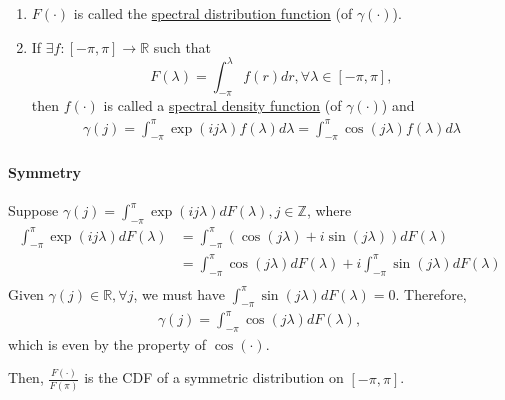 \documentclass[11pt]{elegantbook}
\begin{document}
\begin{remark}
    \begin{enumerate}
        \item $F(\cdot)$ is called the \underline{spectral distribution function} (of $\gamma(\cdot)$).
        \item If $\exists f:[-\pi, \pi] \rightarrow \mathbb{R}$ such that $$F(\lambda)=\int_{-\pi}^\lambda f(r)d r, \forall \lambda\in[-\pi, \pi],$$
        then $f(\cdot)$ is called a \underline{spectral density function} (of $\gamma(\cdot)$) and
        \begin{equation}
            \begin{aligned}
                \gamma(j)=\int_{-\pi}^\pi \exp\left(ij\lambda\right)f(\lambda)d \lambda = \int_{-\pi}^\pi \cos(j\lambda) f(\lambda) d \lambda
            \end{aligned}
            \nonumber
        \end{equation}
    \end{enumerate}
\end{remark}


\paragraph*{Symmetry} Suppose $\gamma(j)=\int_{-\pi}^\pi \exp\left(ij\lambda\right)d F(\lambda),j\in \mathbb{Z}$, where
\begin{equation}
    \begin{aligned}
        \int_{-\pi}^\pi \exp\left(ij\lambda\right)d F(\lambda)&=\int_{-\pi}^\pi \left(\cos(j\lambda)+i\sin(j\lambda)\right)d F(\lambda)\\
        &=\int_{-\pi}^\pi \cos(j\lambda)d F(\lambda) + i\int_{-\pi}^\pi\sin(j\lambda)d F(\lambda)\\
    \end{aligned}
    \nonumber
\end{equation}
Given $\gamma(j)\in \mathbb{R},\forall j$, we must have $\int_{-\pi}^\pi\sin(j\lambda)d F(\lambda)=0$. Therefore,
\begin{equation}
    \begin{aligned}
        \gamma(j)=\int_{-\pi}^\pi \cos(j\lambda)d F(\lambda),
    \end{aligned}
    \nonumber
\end{equation}
which is even by the property of $\cos(\cdot)$.

Then, $\frac{F(\cdot)}{F(\pi)}$ is the CDF of a symmetric distribution on $[-\pi, \pi]$.
\end{document}
